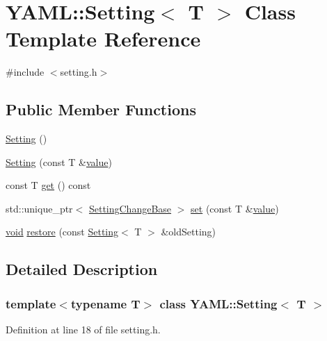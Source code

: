 \hypertarget{class_y_a_m_l_1_1_setting}{}\section{Y\+A\+ML\+::Setting$<$ T $>$ Class Template Reference}
\label{class_y_a_m_l_1_1_setting}


{\ttfamily \#include $<$setting.\+h$>$}

\subsection*{Public Member Functions}
\begin{DoxyCompactItemize}
\item 
\mbox{\hyperlink{class_y_a_m_l_1_1_setting_ace58792f00f4106cf1f1abd21ca1591b}{Setting}} ()
\item 
\mbox{\hyperlink{class_y_a_m_l_1_1_setting_aa189661e44391066a6b09bcb2f00676c}{Setting}} (const T \&\mbox{\hyperlink{glad_8h_a03aff08f73d7fde3d1a08e0abd8e84fa}{value}})
\item 
const T \mbox{\hyperlink{class_y_a_m_l_1_1_setting_a867bf7d693eb31438577ca0c9ee6205e}{get}} () const
\item 
std\+::unique\+\_\+ptr$<$ \mbox{\hyperlink{class_y_a_m_l_1_1_setting_change_base}{Setting\+Change\+Base}} $>$ \mbox{\hyperlink{class_y_a_m_l_1_1_setting_ae9634ee7d2e5a32600090e17ffaab727}{set}} (const T \&\mbox{\hyperlink{glad_8h_a03aff08f73d7fde3d1a08e0abd8e84fa}{value}})
\item 
\mbox{\hyperlink{glad_8h_a950fc91edb4504f62f1c577bf4727c29}{void}} \mbox{\hyperlink{class_y_a_m_l_1_1_setting_a4835f946c5bf1c99b351a405cfb81838}{restore}} (const \mbox{\hyperlink{class_y_a_m_l_1_1_setting}{Setting}}$<$ T $>$ \&old\+Setting)
\end{DoxyCompactItemize}


\subsection{Detailed Description}
\subsubsection*{template$<$typename T$>$\newline
class Y\+A\+M\+L\+::\+Setting$<$ T $>$}



Definition at line 18 of file setting.\+h.



